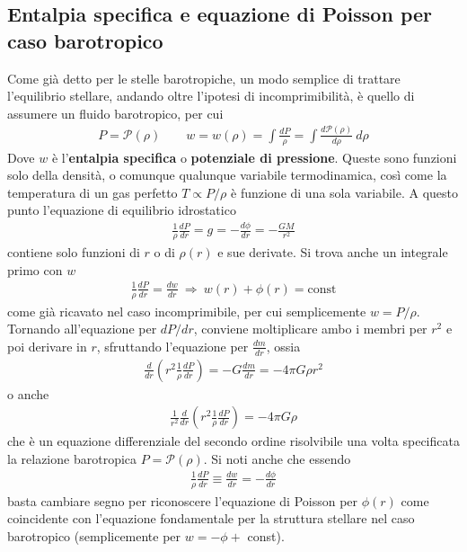 \documentclass[a4paper, oneside]{book}
\begin{document}
\subsection{Entalpia specifica e equazione di Poisson per caso barotropico}
Come già detto per le stelle barotropiche, un modo semplice di trattare l'equilibrio stellare, andando oltre l'ipotesi 
di incomprimibilità, è quello di assumere un fluido barotropico, per cui 
\begin{gather*}
    P = \mathcal{P}(\rho) \qquad w = w(\rho) = \int \frac{dP}{\rho} = \int \frac{d\mathcal{P}(\rho)}{d\rho} \ d\rho  
\end{gather*}
Dove $w$ è l'\textbf{entalpia specifica} o \textbf{potenziale di pressione}. Queste sono funzioni solo della densità, o comunque qualunque variabile termodinamica, così
come la temperatura di un gas perfetto $T \propto P/\rho$ è funzione di una sola variabile. A questo punto l'equazione di equilibrio 
idrostatico 
\begin{gather*}
    \frac{1}{\rho }\frac{dP}{dr} = g = - \frac{d\phi}{dr} = - \frac{GM}{r^{2}}
\end{gather*}
contiene solo funzioni di $r$ o di $\rho(r)$ e sue derivate. Si trova anche 
un integrale primo con $w$ 
\begin{gather*}
    \frac{1}{\rho} \frac{dP}{dr} = \frac{dw}{dr} \ \Longrightarrow \ w(r) + \phi(r) = \text{const} 
\end{gather*}
come già ricavato nel caso incomprimibile, per cui semplicemente $w = P/\rho$. Tornando 
all'equazione per $dP/dr$, conviene moltiplicare ambo i membri per $r^{2}$ e poi 
derivare in $r$, sfruttando l'equazione per $\frac{dm}{dr}$, ossia
\begin{gather*}
    \frac{d}{dr}\left(r^{2}\frac{1}{\rho}\frac{dP}{dr}\right) = - G\frac{dm}{dr} = -4\pi G\rho r^{2}
\end{gather*}
o anche 
\begin{align}
    \boxed{\frac{1}{r^{2}} \frac{d}{dr}\left(r^{2} \frac{1}{\rho} \frac{dP}{dr}\right) = -4\pi G\rho}
\end{align}
che è un equazione differenziale del secondo ordine risolvibile una volta specificata la relazione 
barotropica $P = \mathcal{P}(\rho)$. Si noti anche che essendo 
\begin{gather*}
    \frac{1}{\rho} \frac{dP}{dr} \equiv \frac{dw}{dr} = - \frac{d\phi}{dr}
\end{gather*}
basta cambiare segno per riconoscere l'equazione di Poisson per $\phi(r)$ come coincidente con l'equazione 
fondamentale per la struttura stellare nel caso barotropico (semplicemente per $w = - \phi +$ const). 
\end{document}
